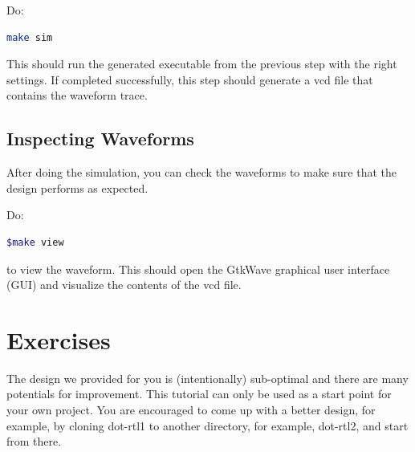 \documentclass[12pt]{article}
\begin{document}
Do:

\begin{lstlisting}[language=bash]
make sim
\end{lstlisting}

This should run the generated executable from the previous step with
the right settings. If completed successfully, this step should
generate a vcd file that contains the waveform trace.

\subsection{Inspecting Waveforms}

After doing the simulation, you can check the waveforms to make
sure that the design performs as expected.

Do: 

\begin{lstlisting}[language=bash]
  $make view
\end{lstlisting}

to view the waveform. This should open the GtkWave graphical user interface (GUI)
and visualize the contents of the vcd file.

\section{Exercises}

The design we provided for you is (intentionally) sub-optimal and
there are many potentials for improvement. This tutorial can only be
used as a start point for your own project. You are encouraged to
come up with a better design, for example, by cloning dot-rtl1 to
another directory, for example, dot-rtl2, and start from there.
\end{document}
